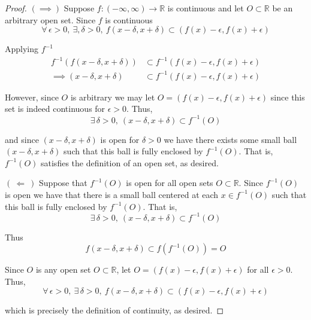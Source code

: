 \documentclass[12pt]{article}
\newlength\tindent
\renewcommand{\indent}{\hspace*{\tindent}}
\newcommand{\R}{\mathbb R}
\newcommand{\limplies}{~\Longleftarrow ~} %
\newcommand{\rimplies}{\implies} %
\begin{document}
\begin{proof} $(\implies)$ Suppose $f:(-\infty,\infty) \to \R$ is continuous and let $O \subset \R$ be an arbitrary open set. Since $f$ is continuous
\begin{equation*}
	\forall\,\epsilon > 0,~\exists,\delta > 0,~f(x - \delta, x + \delta) \subset (f(x) - \epsilon, f(x) + \epsilon)
\end{equation*}

Applying $f^{-1}$
\begin{align*}
	f^{-1}(f(x - \delta, x + \delta)) &\subset f^{-1}(f(x) - \epsilon, f(x) + \epsilon) \\
	\implies (x - \delta, x + \delta) &\subset f^{-1}(f(x) - \epsilon, f(x) + \epsilon)
\end{align*}

\indent However, since $O$ is arbitrary we may let $O = (f(x) - \epsilon, f(x) + \epsilon)$ since this set is indeed continuous for $\epsilon > 0$. Thus,
\begin{equation*}
	\exists\,\delta > 0,~ (x - \delta, x + \delta) \subset f^{-1}(O)
\end{equation*}

and since $(x - \delta, x + \delta)$ is open for $\delta > 0$ we have there exists some small ball $(x - \delta, x + \delta)$ such that this ball is fully enclosed by $f^{-1}(O)$. That is, $f^{-1}(O)$ satisfies the definition of an open set, as desired.

$(\limplies)$ Suppose that $f^{-1}(O)$ is open for all open sets $O \subset \R$. Since $f^{-1}(O)$ is open we have that there is a small ball centered at each $x \in f^{-1}(O)$ such that this ball is fully enclosed by $f^{-1}(O)$. That is,
\begin{equation*}
	\exists\,\delta > 0,~(x - \delta, x + \delta) \subset f^{-1}(O)
\end{equation*}

Thus
\begin{equation*}
	f(x - \delta, x + \delta) \subset f(f^{-1}(O)) = O
\end{equation*}

Since $O$ is any open set $O \subset \R$, let $O = (f(x) - \epsilon, f(x) + \epsilon)$ for all $\epsilon > 0$. Thus,
\begin{equation*}
	\forall\,\epsilon > 0,~\exists\,\delta > 0,~ f(x - \delta, x + \delta) \subset (f(x) - \epsilon, f(x) + \epsilon)
\end{equation*}

which is precisely the definition of continuity, as desired.
\end{proof}
\end{document}
